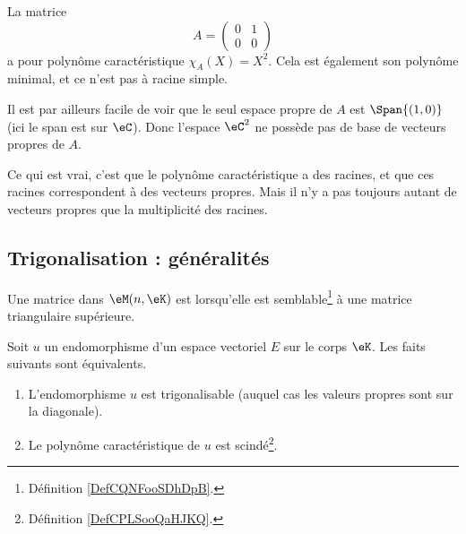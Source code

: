 \begin{example}
    La matrice
    \begin{equation}
        A=\begin{pmatrix}
            0    &   1    \\ 
            0    &   0    
        \end{pmatrix}
    \end{equation}
    a pour polynôme caractéristique \( \chi_A(X)=X^2\). Cela est également son polynôme minimal, et ce n'est pas à racine simple. 

    Il est par ailleurs facile de voir que le seul espace propre de \( A\) est \( \Span\{ (1,0) \}\) (ici le span est sur \( \eC\)). Donc l'espace \( \eC^2\) ne possède pas de base de vecteurs propres de \( A\).
\end{example}

Ce qui est vrai, c'est que le polynôme caractéristique a des racines, et que ces racines correspondent à des vecteurs propres. Mais il n'y a pas toujours autant de vecteurs propres que la multiplicité des racines.

\subsection{Trigonalisation : généralités}

\begin{definition}
    Une matrice dans \( \eM(n,\eK)\) est  lorsqu'elle est semblable\footnote{Définition \ref{DefCQNFooSDhDpB}.} à une matrice triangulaire supérieure.
\end{definition}

\begin{proposition} \label{PropKNVFooQflQsJ}
    Soit \( u\) un endomorphisme d'un espace vectoriel \( E\) sur le corps \( \eK\). Les faits suivants sont équivalents.
    \begin{enumerate}
        \item   \label{ItemZKDMooOrTHkwi}
            L'endomorphisme \( u\) est trigonalisable (auquel cas les valeurs propres sont sur la diagonale).
        \item   \label{ItemZKDMooOrTHkwii}
            Le polynôme caractéristique de \( u\) est scindé\footnote{Définition \ref{DefCPLSooQaHJKQ}.}.
    \end{enumerate}
\end{proposition}

